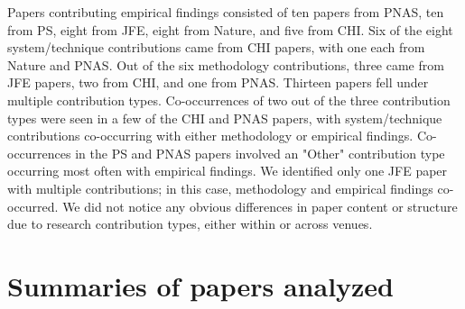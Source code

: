 Papers contributing empirical findings consisted of ten papers from PNAS, ten from
PS, eight from JFE, eight from Nature, and five from CHI. Six of the eight
system/technique contributions came from CHI papers, with one each from Nature and PNAS.
Out of the six methodology contributions, three came from JFE papers, two from
CHI, and one from PNAS. Thirteen papers fell under multiple contribution types.
Co-occurrences of two out of the three contribution types were seen in a few of
the CHI and PNAS papers, with system/technique contributions co-occurring
with either methodology or empirical findings. Co-occurrences in the PS and PNAS
papers involved an "Other" contribution type occurring most often with empirical
findings. We identified only one JFE paper with multiple contributions; in this
case, methodology and empirical findings co-occurred. We did not notice any
obvious differences in paper content or structure due to research contribution
types, either within or across venues.

\clearpage
\section{Summaries of papers analyzed}
\tableContributions

% 
% 